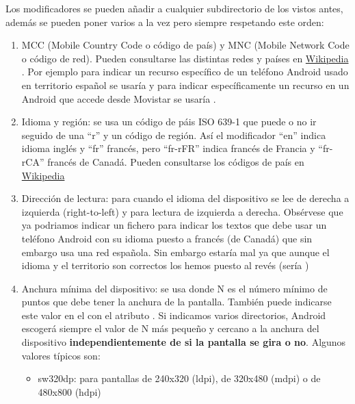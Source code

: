 \documentclass[a4paper,12pt,spanish]{sphinxmanual}
\begin{document}
Los modificadores se pueden añadir a cualquier subdirectorio de los vistos antes, además se pueden poner varios a la vez pero siempre respetando este orden:
\begin{enumerate}
\item {} 
MCC (Mobile Country Code o código de país) y MNC (Mobile Network Code o código de red). Pueden consultarse las distintas redes y países en \href{http://es.wikipedia.org/wiki/MCC/MNC}{Wikipedia} . Por ejemplo para indicar un recurso específico de un teléfono Android usado en territorio español se usaría  y para indicar específicamente un recurso en un Android que accede desde Movistar se usaría .

\item {} 
Idioma y región: se usa un código de páis ISO 639-1 que puede o no ir seguido de una ``r'' y un código de región. Así el modificador ``en'' indica idioma inglés y ``fr'' francés, pero ``fr-rFR'' indica francés de Francia y ``fr-rCA'' francés de Canadá. Pueden consultarse los códigos de país en \href{http://en.wikipedia.org/wiki/List\_of\_ISO\_639-1\_codes}{Wikipedia}

\item {} 
Dirección de lectura:  para cuando el idioma del dispositivo se lee de derecha a izquierda (right-to-left) y  para lectura de izquierda a derecha. Obsérvese que ya podriamos indicar un fichero  para indicar los textos que debe usar un teléfono Android con su idioma puesto a francés (de Canadá) que sin embargo usa una red española. Sin embargo  estaría mal ya que aunque el idioma y el territorio son correctos los hemos puesto al revés (sería )

\item {} 
Anchura mínima del dispositivo: se usa  donde N es el número mínimo de puntos que debe tener la anchura de la pantalla. También puede indicarse este valor en el  con el atributo . Si indicamos varios directorios, Android escogerá siempre el valor de N más pequeño y cercano a la anchura del dispositivo \textbf{independientemente de si la pantalla se gira o no}. Algunos valores típicos son:
\begin{itemize}
\item {} 
sw320dp: para pantallas de 240x320 (ldpi), de 320x480 (mdpi) o de 480x800 (hdpi)


\end{itemize}
\end{enumerate}
\end{document}
